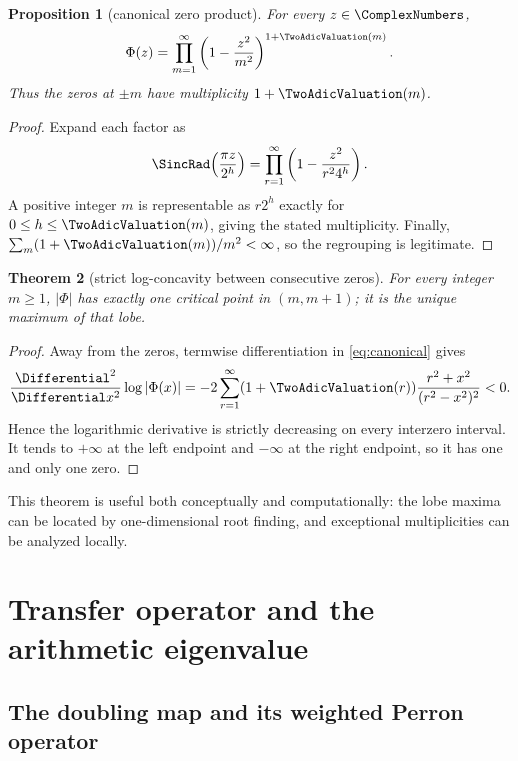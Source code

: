 \documentclass[11pt,oneside]{article}
\newtheorem{theorem}{Theorem}[section]
\newtheorem{proposition}[theorem]{Proposition}
\theoremstyle{definition}
\theoremstyle{remark}
\begin{document}
\begin{proposition}[canonical zero product]
\label{prop:canonical}
For every \(z\in\ComplexNumbers\),
\begin{equation}
 \Phi(z)=\prod_{m=1}^{\infty}
 \left(1-\frac{z^2}{m^2}\right)^{1+\TwoAdicValuation(m)}.
 \label{eq:canonical}
\end{equation}
Thus the zeros at \(\pm m\) have multiplicity \(1+\TwoAdicValuation(m)\).
\end{proposition}

\begin{proof}
Expand each factor as
\[
 \SincRad\!\left(\frac{\pi z}{2^h}\right)
 =\prod_{r=1}^{\infty}\left(1-\frac{z^2}{r^2 4^h}\right).
\]
A positive integer \(m\) is representable as \(r2^h\) exactly for
\(0\le h\le\TwoAdicValuation(m)\), giving the stated multiplicity.  Finally,
\(\sum_m(1+\TwoAdicValuation(m))/m^2<\infty\), so the regrouping is legitimate.
\end{proof}

\begin{theorem}[strict log-concavity between consecutive zeros]
\label{thm:one-peak}
For every integer \(m\ge1\), \(|\Phi|\) has exactly one critical point in
\((m,m+1)\); it is the unique maximum of that lobe.
\end{theorem}

\begin{proof}
Away from the zeros, termwise differentiation in \eqref{eq:canonical} gives
\begin{equation}
 \frac{\Differential^2}{\Differential x^2}\log|\Phi(x)|
 =-2\sum_{r=1}^{\infty}(1+\TwoAdicValuation(r))
 \frac{r^2+x^2}{(r^2-x^2)^2}<0.
 \label{eq:strict-log-concavity}
\end{equation}
Hence the logarithmic derivative is strictly decreasing on every interzero
interval.  It tends to \(+\infty\) at the left endpoint and \(-\infty\) at
the right endpoint, so it has one and only one zero.
\end{proof}

This theorem is useful both conceptually and computationally: the lobe maxima
can be located by one-dimensional root finding, and exceptional multiplicities
can be analyzed locally.

\section{Transfer operator and the arithmetic eigenvalue}
\label{sec:transfer}

\subsection{The doubling map and its weighted Perron operator}
\end{document}
